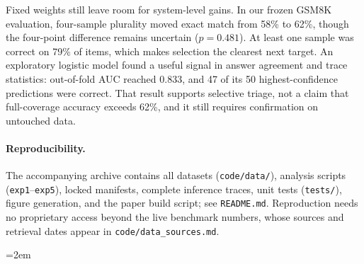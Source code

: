 \documentclass[11pt]{article}
\begin{document}
Fixed weights still leave room for system-level gains. In our frozen GSM8K
evaluation, four-sample plurality moved exact match from 58\% to 62\%, though
the four-point difference remains uncertain ($p=0.481$). At least one sample
was correct on 79\% of items, which makes selection the clearest next target.
An exploratory logistic model found a useful signal in answer agreement and
trace statistics: out-of-fold AUC reached 0.833, and 47 of its 50
highest-confidence predictions were correct. That result supports selective
triage, not a claim that full-coverage accuracy exceeds 62\%, and it still
requires confirmation on untouched data.

\paragraph{Reproducibility.} The accompanying archive contains all
datasets (\texttt{code/data/}), analysis scripts
(\texttt{exp1}--\texttt{exp5}), locked manifests, complete inference traces,
unit tests (\texttt{tests/}), figure generation, and the paper build script;
see \texttt{README.md}. Reproduction needs no proprietary access beyond the
live benchmark numbers, whose sources and retrieval dates appear in
\texttt{code/data\_sources.md}.


\begingroup
\emergencystretch=2em

\endgroup
\end{document}

